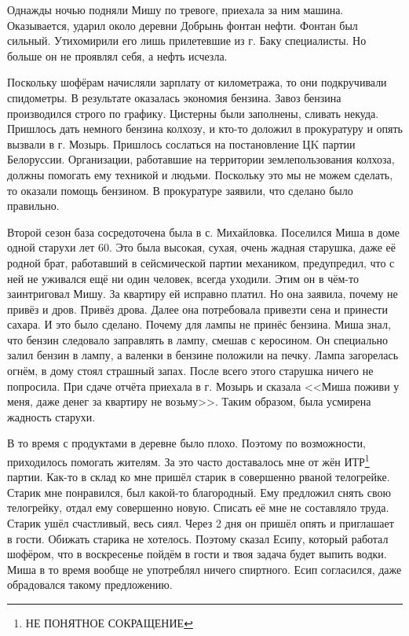 Однажды ночью подняли Мишу по тревоге, приехала за ним машина. Оказывается, ударил около деревни Добрынь фонтан нефти. Фонтан был сильный. Утихомирили его лишь прилетевшие из г. Баку специалисты. Но больше он не проявлял себя, а нефть исчезла. 

Поскольку шофёрам начисляли зарплату от километража, то они подкручивали спидометры. В результате оказалась экономия бензина. Завоз бензина производился строго по графику. Цистерны были заполнены, сливать некуда. Пришлось дать немного бензина колхозу, и кто-то доложил в прокуратуру и опять вызвали в г. Мозырь. Пришлось сослаться на постановление ЦK партии Белоруссии. Организации, работавшие на территории землепользования колхоза, должны помогать ему техникой и людьми. Поскольку это мы не можем сделать, то оказали помощь бензином. В прокуратуре заявили, что сделано было правильно.

Второй сезон база сосредоточена была в с. Михайловка. Поселился Миша в доме одной старухи лет 60. Это была высокая, сухая, очень жадная старушка, даже её родной брат, работавший в сейсмической партии механиком, предупредил, что с ней не уживался ещё ни один человек, всегда уходили. Этим он в чём-то заинтриговал Мишу. За квартиру ей исправно платил. Но она заявила, почему не привёз и дров. Привёз дрова. Далее она потребовала привезти сена и принести сахара. И это было сделано. Почему для лампы не принёс бензина. Миша знал, что бензин следовало заправлять в лампу, смешав с керосином. Он специально залил бензин в лампу, а валенки в бензине положили на печку. Лампа загорелась огнём, в дому стоял страшный запах. После всего этого старушка ничего не попросила. При сдаче отчёта приехала в г. Мозырь и сказала <<Миша поживи у меня, даже денег за квартиру не возьму>>. Таким образом, была усмирена жадность старухи.

В то время с продуктами в деревне было плохо. Поэтому по возможности, приходилось помогать жителям. За это часто доставалось мне от жён ИТР\footnote{НЕ ПОНЯТНОЕ СОКРАЩЕНИЕ} партии. Как-то в склад ко мне пришёл старик в совершенно рваной телогрейке. Старик мне понравился, был какой-то благородный. Ему предложил снять свою телогрейку, отдал ему совершенно новую. Списать её мне не составляло труда. Старик ушёл счастливый, весь сиял. Через 2 дня он пришёл опять и приглашает в гости. Обижать старика не хотелось. Поэтому сказал Есипу, который работал шофёром, что в воскресенье пойдём в гости и твоя задача будет выпить водки. Миша в то время вообще не употреблял ничего спиртного. Есип согласился, даже обрадовался такому предложению. 

